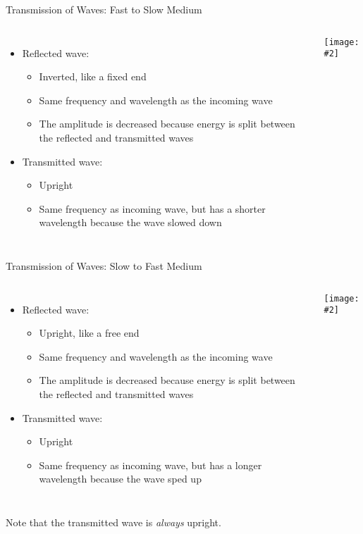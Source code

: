 \documentclass[12pt,aspectratio=169]{beamer}
\newcommand{\pic}[2]{\texttt{[image: \#2]}}
\begin{document}
\begin{frame}{Transmission of Waves: Fast to Slow Medium}
  \begin{columns}
    \begin{itemize}
    \item Reflected wave:
      \begin{itemize}
      \item Inverted, like a fixed end
      \item Same frequency and wavelength as the incoming wave
      \item The amplitude is decreased because energy is split between the
        reflected and transmitted waves
      \end{itemize}
    \item Transmitted wave:
      \begin{itemize}
      \item Upright
      \item Same frequency as incoming wave, but has a shorter wavelength
        because the wave slowed down
      \end{itemize}
    \end{itemize}
    
    \pic{1}{23.png}
  \end{columns}
\end{frame}


\begin{frame}{Transmission of Waves: Slow to Fast Medium}
  \begin{columns}
    \begin{itemize}
    \item Reflected wave:
      \begin{itemize}
      \item Upright, like a free end
      \item Same frequency and wavelength as the incoming wave
      \item The amplitude is decreased because energy is split between the
        reflected and transmitted waves
      \end{itemize}
    \item Transmitted wave:
      \begin{itemize}
      \item Upright
      \item Same frequency as incoming wave, but has a longer wavelength because
        the wave sped up
      \end{itemize}
    \end{itemize}
    
    \pic{1}{24.png}
  \end{columns}
  Note that the transmitted wave is \emph{always} upright.
\end{frame}
\end{document}
